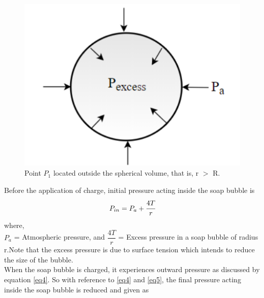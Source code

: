 \begin{figure}
     \centering 
     \includegraphics[scale = 0.5]{figures/Sandesh's Figures/fig2.png}
     \caption{Point $P_1$ located outside the spherical volume, that is, r $>$ R. }
     \label{fig5}
 \end{figure}
Before the application of charge, initial pressure acting inside the soap bubble is 
\begin{equation}\label{eq5}
    P_{in} = P_a + \cfrac{4T}{r}
\end{equation}
where,\\
$P_a$ = Atmospheric pressure, and
$\dfrac{4T}{r}$ = Excess pressure in a soap bubble of radius r.Note that the excess pressure is due to surface tension which intends to reduce the size of the bubble.\\
When the soap bubble is charged, it experiences outward pressure as discussed by equation \ref{eq4}. So with reference to \ref{eq4} and \ref{eq5}, the final pressure acting inside the soap bubble is reduced and given as 


